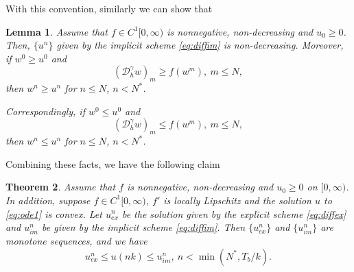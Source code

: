 \documentclass[12pt]{amsart}%
\newtheorem{thm}{Theorem}[section]
\newtheorem{lmm}[thm]{Lemma}
\theoremstyle{definition}
\theoremstyle{remark}
\renewcommand{\ge}{\geqslant}
\renewcommand{\le}{\leqslant}
\begin{document}
With this convention, similarly we can show that
\begin{lmm}\label{lmm:discretecompim}
Assume that $f \in C^1[0,\infty)$ is nonnegative, non-decreasing and $u_0 \ge 0$. Then, $\{u^n\}$ given by the implicit scheme \eqref{eq:diffim} is non-decreasing. Moreover, if $w^0\ge u^0$ and \[
(\mathcal{D}_h^\gamma w)_{m}\ge f(w^{m}), ~ m\le N,
\]
then $w^n\ge u^n$ for $n\le N$, $n<N^*$.

Correspondingly, if  $w^0\le u^0$ and \[
(\mathcal{D}_h^\gamma w)_{m}\le f(w^{m}),~ m\le N,
\]
then $w^n\le u^n$ for $n\le N$, $n<N^*$.
\end{lmm} 

Combining these facts, we have the following claim
\begin{thm}\label{thm:diffnum}
Assume that $f$ is nonnegative, non-decreasing and $u_0 \ge 0$ on $[0,\infty)$. In addition, suppose $f\in C^1[0,\infty)$, $f'$ is locally Lipschitz and the solution $u$ to \eqref{eq:ode1} is convex. Let $u_{ex}^n$ be the solution given by the explicit scheme \eqref{eq:diffex} and $u_{im}^n$ be given by the implicit scheme \eqref{eq:diffim}. Then $\{u_{ex}^n\}$ and $\{u_{im}^n\}$ are monotone sequences, and we have \[
u_{ex}^n\le u(nk)\le u_{im}^n, ~ n<\min(N^*, T_b/k).
\]
\end{thm}
\end{document}
